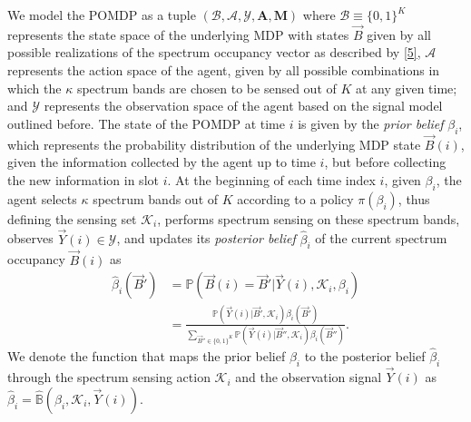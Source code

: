 \documentclass[10pt,twocolumn]{IEEEtran}
\begin{document}
We model the POMDP as a tuple $(\mathcal B,\mathcal{A},\mathcal{Y},\mathbf{A},\mathbf{M})$ where $\mathcal{B}\equiv\{0,1\}^K$ represents the state space of the underlying MDP with states $\vec{B}$ given by all possible realizations of the spectrum occupancy vector as described by \eqref{5}, $\mathcal{A}$ represents the action space of the agent, given by all possible combinations in which the $\kappa$ spectrum bands are chosen to be sensed out of $K$ at any given time; and $\mathcal{Y}$ represents the observation space of the agent based on the signal model outlined before. The state of the POMDP at time $i$ is given by the \emph{prior belief} $\beta_i$, which represents the probability distribution of the underlying MDP state $\vec{B}(i)$, given the information collected by the agent up to time $i$, but before collecting the new information in slot $i$. At the beginning of each time index $i$, given $\beta_i$, the agent selects $\kappa$ spectrum bands out of $K$ according to a policy $\pi(\beta_i)$, thus defining the sensing set $\mathcal K_i$, performs spectrum sensing  on these spectrum bands, observes $\vec{Y}(i){\in} \mathcal{Y}$, and updates its \emph{posterior belief} $\hat{\beta}_i$ of the current spectrum occupancy $\vec{B}(i)$ as 
\begin{align}\label{11}
\hat\beta_i(\vec{B}') &= \mathbb{P}(\vec{B}(i) = \vec{B}'|\vec{Y}(i), \mathcal K_i, \beta_i)\\&=
\nonumber
\frac{\mathbb{P}(\vec{Y}(i)|\vec{B}', \mathcal{K}_i) \beta_i(\vec{B}')}{
\sum_{\vec{B}'' {\in} \{0,1\}^K} \mathbb{P}(\vec{Y}(i)|\vec{B}'', \mathcal{K}_i) \beta_i(\vec{B}'')}.
\end{align}
We denote the function that maps the prior belief $\beta_i$ to the posterior belief $\hat\beta_i$ through the spectrum sensing action $\mathcal K_i$ and the observation signal $\vec{Y}(i)$ as $\hat\beta_i=\hat{\mathbb B}(\beta_i, \mathcal K_i, \vec{Y}(i))$.
\end{document}
